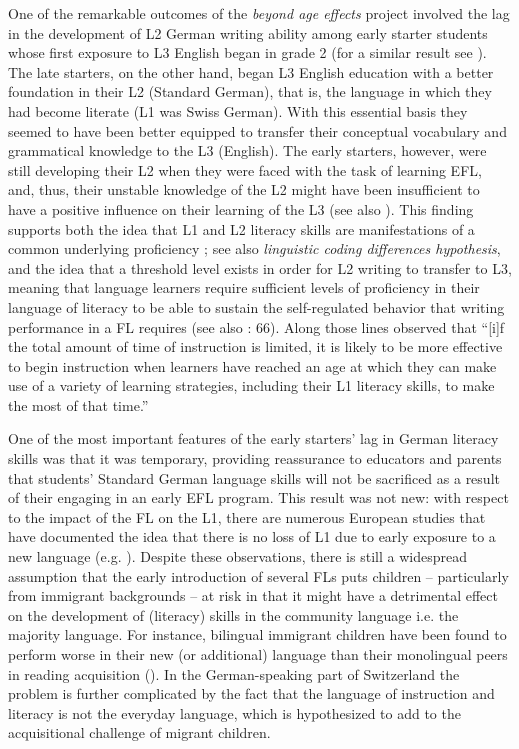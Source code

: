 \documentclass[output=paper,modfonts,nonflat,newtxmath]{langsci/langscibook}
\begin{document}
One of the remarkable outcomes of the \textit{beyond age effects} project involved the lag in the development of L2 German writing ability among early starter students whose first exposure to L3 English began in grade 2 (for a similar result see \citealt{Genesee2004}). The late starters, on the other hand, began L3 English education with a better foundation in their L2 (Standard German), that is, the language in which they had become literate (L1 was Swiss German). With this essential basis they seemed to have been better equipped to transfer their conceptual vocabulary and grammatical knowledge to the L3 (English). The early starters, however, were still developing their L2 when they were faced with the task of learning EFL, and, thus, their unstable knowledge of the L2 might have been insufficient to have a positive influence on their learning of the L3 (see also \citealt{Sánchez2012, Sánchez2015}). This finding supports both the idea that L1 and L2 literacy skills are manifestations of a common underlying proficiency \citep{Cummins1976, Cummins1981}; see also  \textit{linguistic coding differences hypothesis}, and the idea that  a threshold level exists in order for L2 writing to transfer to L3, meaning that language learners require sufficient levels of proficiency in their language of literacy to be able to sustain the self-regulated behavior that writing performance in a FL requires (see also \citealt{SchoonenEtAl2011}: 66). Along those lines \citet[449]{Lightbown2000} observed that “[i]f the total amount of time of instruction is limited, it is likely to be more effective to begin instruction when learners have reached an age at which they can make use of a variety of learning strategies, including their L1 literacy skills, to make the most of that time.”

One of the most important features of the early starters’ lag in German literacy skills was that it was temporary, providing reassurance to educators and parents that students’ Standard German language skills will not be sacrificed as a result of their engaging in an early EFL program. This result was not new: with respect to the impact of the FL on the L1, there are numerous European studies that have documented the idea that there is no loss of L1 due to early exposure to a new language (e.g. \citealt{Goorhuis-BrouwerDeBot2010}). Despite these observations, there is still a widespread assumption that the early introduction of several FLs puts children – particularly from immigrant backgrounds – at risk in that it might have a detrimental effect on the development of (literacy) skills in the community language i.e. the majority language. For instance, bilingual immigrant children have been found to perform worse in their new (or additional) language than their monolingual peers in reading acquisition (\citealt{AugustHakuta1997, SlavinCheung2003}). In the German-speaking part of Switzerland the problem is further complicated by the fact that the language of instruction and literacy is not the everyday language, which is hypothesized to add to the acquisitional challenge of migrant children.
\end{document}
